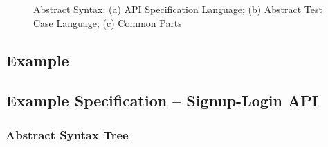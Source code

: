 \documentclass[12pts, a4paper]{article}
\begin{document}
\begin{figure}
%
%
%
%
\caption{Abstract Syntax: (a) API Specification Language; (b) Abstract Test Case Language; (c) Common Parts}
\label{f:abssyn}
\end{figure}

\subsection{Example}
\subsection{Example Specification -- Signup-Login API}
\subsubsection{Abstract Syntax Tree}
\end{document}
